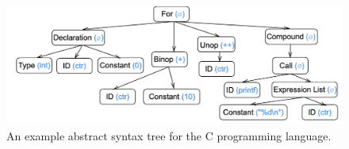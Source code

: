 \begin{figure}[ht]
\begin{center}
	\includegraphics[width=\textwidth]{figures/ast.png}
\end{center}
\caption{An example abstract syntax tree for the C programming 
language.}\label{fig:ast}
\end{figure}

